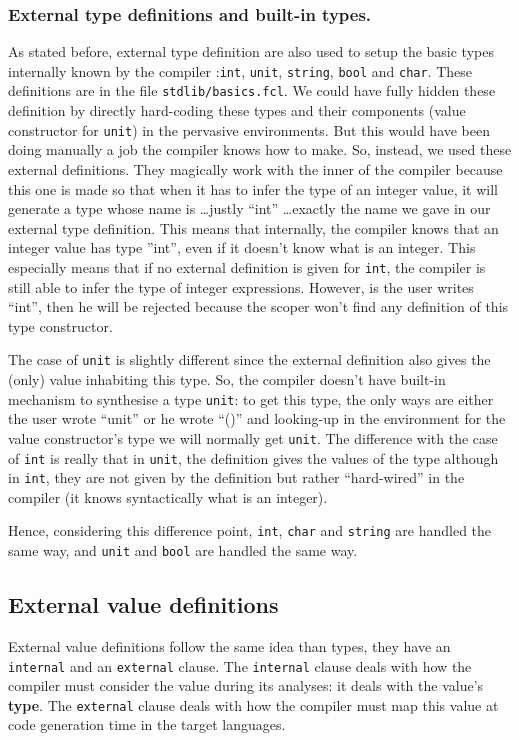 \subsubsection{External type definitions and built-in types.}
\label{external-ty-defs-and-builtin-tys}
As stated before, external type definition are also used to setup the
basic types internally known by the compiler :{\tt int}, {\tt unit},
{\tt string}, {\tt bool} and {\tt char}. These definitions are in the
file {\tt stdlib/basics.fcl}. We could have fully hidden these
definition by directly hard-coding these types and their components
(value constructor for {\tt unit}) in the pervasive environments. But
this would have been doing manually a job the compiler knows how to
make. So, instead, we used these external definitions. They magically
work with the inner of the compiler because this one is made so that
when it has to infer the type of an integer value, it will generate a
type whose name is \ldots justly ``int'' \ldots exactly the name we
gave in our external type definition. This means that internally, the
compiler knows that an integer value has type ''int'', even if it
doesn't know what is an integer. This especially means that if no
external definition is given for {\tt int}, the compiler is still able
to infer the type of integer expressions. However, is the user writes
``int'', then he will be rejected because the scoper won't find any
definition of this type constructor.

The case of {\tt unit} is slightly different since the external
definition also gives the (only) value inhabiting this type. So, the
compiler doesn't have built-in mechanism to synthesise a type
{\tt unit}: to get this type, the only ways are either the user wrote
``unit'' or he wrote ``()'' and looking-up in the environment for the
value constructor's type we will normally get {\tt unit}. The
difference with the case of {\tt int} is really that in {\tt unit},
the definition gives the values of the type although in {\tt int},
they are not given by the definition but rather ``hard-wired'' in the
compiler (it knows syntactically what is an integer).

Hence, considering this difference point, {\tt int}, {\tt char} and
{\tt string} are handled the same way, and {\tt unit} and {\tt bool}
are handled the same way.



\subsection{External value definitions}
\label{external-value-definition}
External value definitions follow the same idea than types, they have
an {\tt internal} and an {\tt external} clause. The {\tt internal}
clause deals with how the compiler must consider the value during its
analyses: it deals with the value's {\bf type}. The {\tt external}
clause deals with how the compiler must map this value at code
generation time in the target languages.

